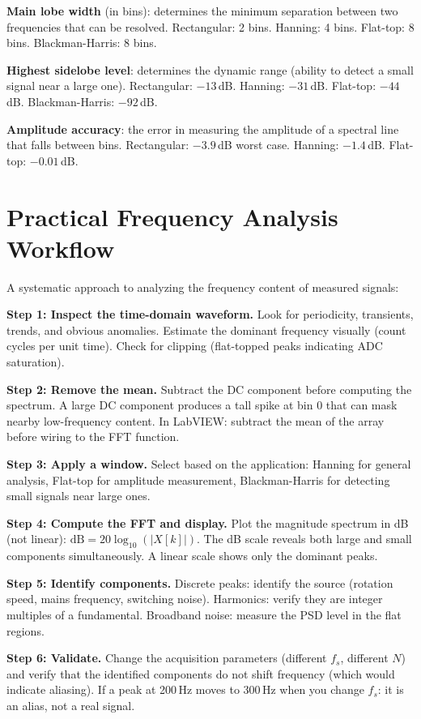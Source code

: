 \documentclass[11pt,letterpaper,twoside,openany]{book}
\begin{document}
\textbf{Main lobe width} (in bins): determines the minimum separation between two frequencies that can be resolved. Rectangular: 2 bins. Hanning: 4 bins. Flat-top: 8 bins. Blackman-Harris: 8 bins.

\textbf{Highest sidelobe level}: determines the dynamic range (ability to detect a small signal near a large one). Rectangular: $-13$\,dB. Hanning: $-31$\,dB. Flat-top: $-44$\,dB. Blackman-Harris: $-92$\,dB.

\textbf{Amplitude accuracy}: the error in measuring the amplitude of a spectral line that falls between bins. Rectangular: $-3.9$\,dB worst case. Hanning: $-1.4$\,dB. Flat-top: $-0.01$\,dB.
\section{Practical Frequency Analysis Workflow}
A systematic approach to analyzing the frequency content of measured signals:

\textbf{Step 1: Inspect the time-domain waveform.} Look for periodicity, transients, trends, and obvious anomalies. Estimate the dominant frequency visually (count cycles per unit time). Check for clipping (flat-topped peaks indicating ADC saturation).

\textbf{Step 2: Remove the mean.} Subtract the DC component before computing the spectrum. A large DC component produces a tall spike at bin 0 that can mask nearby low-frequency content. In LabVIEW: subtract the mean of the array before wiring to the FFT function.

\textbf{Step 3: Apply a window.} Select based on the application: Hanning for general analysis, Flat-top for amplitude measurement, Blackman-Harris for detecting small signals near large ones.

\textbf{Step 4: Compute the FFT and display.} Plot the magnitude spectrum in dB (not linear): $\text{dB} = 20\log_{10}(|X[k]|)$. The dB scale reveals both large and small components simultaneously. A linear scale shows only the dominant peaks.

\textbf{Step 5: Identify components.} Discrete peaks: identify the source (rotation speed, mains frequency, switching noise). Harmonics: verify they are integer multiples of a fundamental. Broadband noise: measure the PSD level in the flat regions.

\textbf{Step 6: Validate.} Change the acquisition parameters (different $f_s$, different $N$) and verify that the identified components do not shift frequency (which would indicate aliasing). If a peak at 200\,Hz moves to 300\,Hz when you change $f_s$: it is an alias, not a real signal.
\end{document}
